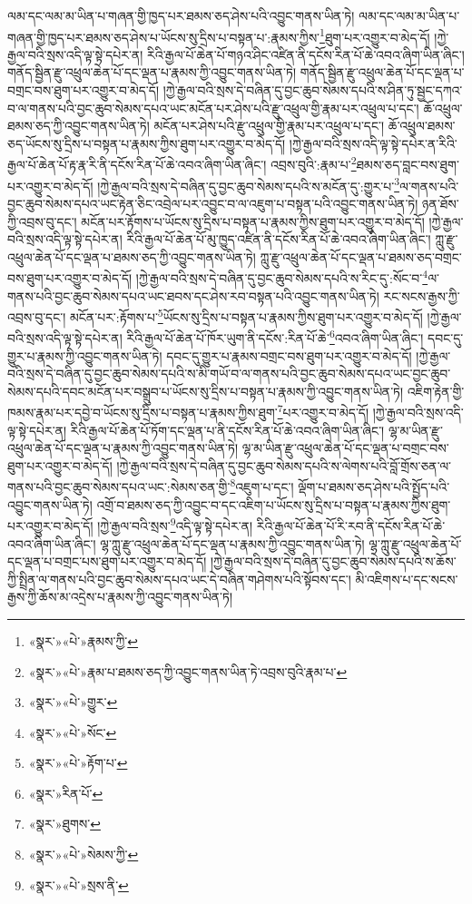 ལམ་དང་ལམ་མ་ཡིན་པ་གཞན་གྱི་ཁྱད་པར་ཐམས་ཅད་ཤེས་པའི་འབྱུང་གནས་ཡིན་ཏེ། ལམ་དང་ལམ་མ་ཡིན་པ་གཞན་གྱི་ཁྱད་པར་ཐམས་ཅད་ཤེས་པ་ཡོངས་སུ་དྲིས་པ་བསྟན་པ་:རྣམས་ཀྱིས་\footnote{«སྣར་»«པེ་»རྣམས་ཀྱི་}ཐུག་པར་འགྱུར་བ་མེད་དོ། །ཀྱེ་རྒྱལ་བའི་སྲས་འདི་ལྟ་སྟེ་དཔེར་ན། རིའི་རྒྱལ་པོ་ཆེན་པོ་གཉའ་ཤིང་འཛིན་ནི་དངོས་རིན་པོ་ཆེ་འབའ་ཞིག་ཡིན་ཞིང་། གནོད་སྦྱིན་རྫུ་འཕྲུལ་ཆེན་པོ་དང་ལྡན་པ་རྣམས་ཀྱི་འབྱུང་གནས་ཡིན་ཏེ། གནོད་སྦྱིན་རྫུ་འཕྲུལ་ཆེན་པོ་དང་ལྡན་པ་བགྲང་བས་ཐུག་པར་འགྱུར་བ་མེད་དོ། །ཀྱེ་རྒྱལ་བའི་སྲས་དེ་བཞིན་དུ་བྱང་ཆུབ་སེམས་དཔའི་ས་ཤིན་ཏུ་སྦྱང་དཀའ་བ་ལ་གནས་པའི་བྱང་ཆུབ་སེམས་དཔའ་ཡང་མངོན་པར་ཤེས་པའི་རྫུ་འཕྲུལ་གྱི་རྣམ་པར་འཕྲུལ་པ་དང་། ཆོ་འཕྲུལ་ཐམས་ཅད་ཀྱི་འབྱུང་གནས་ཡིན་ཏེ། མངོན་པར་ཤེས་པའི་རྫུ་འཕྲུལ་གྱི་རྣམ་པར་འཕྲུལ་པ་དང་། ཆོ་འཕྲུལ་ཐམས་ཅད་ཡོངས་སུ་དྲིས་པ་བསྟན་པ་རྣམས་ཀྱིས་ཐུག་པར་འགྱུར་བ་མེད་དོ། །ཀྱེ་རྒྱལ་བའི་སྲས་འདི་ལྟ་སྟེ་དཔེར་ན་རིའི་རྒྱལ་པོ་ཆེན་པོ་རྟ་རྣ་རི་ནི་དངོས་རིན་པོ་ཆེ་འབའ་ཞིག་ཡིན་ཞིང་། འབྲས་བུའི་:རྣམ་པ་\footnote{«སྣར་»«པེ་»རྣམ་པ་ཐམས་ཅད་ཀྱི་འབྱུང་གནས་ཡིན་ཏེ་འབྲས་བུའི་རྣམ་པ་}ཐམས་ཅད་བླང་བས་ཐུག་པར་འགྱུར་བ་མེད་དོ། །ཀྱེ་རྒྱལ་བའི་སྲས་དེ་བཞིན་དུ་བྱང་ཆུབ་སེམས་དཔའི་ས་མངོན་དུ་:གྱུར་པ་\footnote{«སྣར་»«པེ་»གྱུར་}ལ་གནས་པའི་བྱང་ཆུབ་སེམས་དཔའ་ཡང་རྟེན་ཅིང་འབྲེལ་པར་འབྱུང་བ་ལ་འཇུག་པ་བསྟན་པའི་འབྱུང་གནས་ཡིན་ཏེ། ཉན་ཐོས་ཀྱི་འབྲས་བུ་དང་། མངོན་པར་རྟོགས་པ་ཡོངས་སུ་དྲིས་པ་བསྟན་པ་རྣམས་ཀྱིས་ཐུག་པར་འགྱུར་བ་མེད་དོ། །ཀྱེ་རྒྱལ་བའི་སྲས་འདི་ལྟ་སྟེ་དཔེར་ན། རིའི་རྒྱལ་པོ་ཆེན་པོ་མུ་ཁྱུད་འཛིན་ནི་དངོས་རིན་པོ་ཆེ་འབའ་ཞིག་ཡིན་ཞིང་། ཀླུ་རྫུ་འཕྲུལ་ཆེན་པོ་དང་ལྡན་པ་ཐམས་ཅད་ཀྱི་འབྱུང་གནས་ཡིན་ཏེ། ཀླུ་རྫུ་འཕྲུལ་ཆེན་པོ་དང་ལྡན་པ་ཐམས་ཅད་བགྲང་བས་ཐུག་པར་འགྱུར་བ་མེད་དོ། །ཀྱེ་རྒྱལ་བའི་སྲས་དེ་བཞིན་དུ་བྱང་ཆུབ་སེམས་དཔའི་ས་རིང་དུ་:སོང་བ་\footnote{«སྣར་»«པེ་»སོང་}ལ་གནས་པའི་བྱང་ཆུབ་སེམས་དཔའ་ཡང་ཐབས་དང་ཤེས་རབ་བསྟན་པའི་འབྱུང་གནས་ཡིན་ཏེ། རང་སངས་རྒྱས་ཀྱི་འབྲས་བུ་དང་། མངོན་པར་:རྟོགས་པ་\footnote{«སྣར་»«པེ་»རྟོག་པ་}ཡོངས་སུ་དྲིས་པ་བསྟན་པ་རྣམས་ཀྱིས་ཐུག་པར་འགྱུར་བ་མེད་དོ། །ཀྱེ་རྒྱལ་བའི་སྲས་འདི་ལྟ་སྟེ་དཔེར་ན། རིའི་རྒྱལ་པོ་ཆེན་པོ་ཁོར་ཡུག་ནི་དངོས་:རིན་པོ་ཆེ་\footnote{«སྣར་»རིན་པོ་}འབའ་ཞིག་ཡིན་ཞིང་། དབང་དུ་གྱུར་པ་རྣམས་ཀྱི་འབྱུང་གནས་ཡིན་ཏེ། དབང་དུ་གྱུར་པ་རྣམས་བགྲང་བས་ཐུག་པར་འགྱུར་བ་མེད་དོ། །ཀྱེ་རྒྱལ་བའི་སྲས་དེ་བཞིན་དུ་བྱང་ཆུབ་སེམས་དཔའི་ས་མི་གཡོ་བ་ལ་གནས་པའི་བྱང་ཆུབ་སེམས་དཔའ་ཡང་བྱང་ཆུབ་སེམས་དཔའི་དབང་མངོན་པར་བསྒྲུབ་པ་ཡོངས་སུ་དྲིས་པ་བསྟན་པ་རྣམས་ཀྱི་འབྱུང་གནས་ཡིན་ཏེ། འཇིག་རྟེན་གྱི་ཁམས་རྣམ་པར་དབྱེ་བ་ཡོངས་སུ་དྲིས་པ་བསྟན་པ་རྣམས་ཀྱིས་ཐུག་\footnote{«སྣར་»ཐུགས་}པར་འགྱུར་བ་མེད་དོ། །ཀྱེ་རྒྱལ་བའི་སྲས་འདི་ལྟ་སྟེ་དཔེར་ན། རིའི་རྒྱལ་པོ་ཆེན་པོ་ཏོག་དང་ལྡན་པ་ནི་དངོས་རིན་པོ་ཆེ་འབའ་ཞིག་ཡིན་ཞིང་། ལྷ་མ་ཡིན་རྫུ་འཕྲུལ་ཆེན་པོ་དང་ལྡན་པ་རྣམས་ཀྱི་འབྱུང་གནས་ཡིན་ཏེ། ལྷ་མ་ཡིན་རྫུ་འཕྲུལ་ཆེན་པོ་དང་ལྡན་པ་བགྲང་བས་ཐུག་པར་འགྱུར་བ་མེད་དོ། །ཀྱེ་རྒྱལ་བའི་སྲས་དེ་བཞིན་དུ་བྱང་ཆུབ་སེམས་དཔའི་ས་ལེགས་པའི་བློ་གྲོས་ཅན་ལ་གནས་པའི་བྱང་ཆུབ་སེམས་དཔའ་ཡང་:སེམས་ཅན་གྱི་\footnote{«སྣར་»«པེ་»སེམས་ཀྱི་}འཇུག་པ་དང་། ལྡོག་པ་ཐམས་ཅད་ཤེས་པའི་སྤྱོད་པའི་འབྱུང་གནས་ཡིན་ཏེ། འགྲོ་བ་ཐམས་ཅད་ཀྱི་འབྱུང་བ་དང་འཇིག་པ་ཡོངས་སུ་དྲིས་པ་བསྟན་པ་རྣམས་ཀྱིས་ཐུག་པར་འགྱུར་བ་མེད་དོ། །ཀྱེ་རྒྱལ་བའི་སྲས་\footnote{«སྣར་»«པེ་»སྲས་ནི་}འདི་ལྟ་སྟེ་དཔེར་ན། རིའི་རྒྱལ་པོ་ཆེན་པོ་རི་རབ་ནི་དངོས་རིན་པོ་ཆེ་འབའ་ཞིག་ཡིན་ཞིང་། ལྷ་ཀླུ་རྫུ་འཕྲུལ་ཆེན་པོ་དང་ལྡན་པ་རྣམས་ཀྱི་འབྱུང་གནས་ཡིན་ཏེ། ལྷ་ཀླུ་རྫུ་འཕྲུལ་ཆེན་པོ་དང་ལྡན་པ་བགྲང་པས་ཐུག་པར་འགྱུར་བ་མེད་དོ། །ཀྱེ་རྒྱལ་བའི་སྲས་དེ་བཞིན་དུ་བྱང་ཆུབ་སེམས་དཔའི་ས་ཆོས་ཀྱི་སྤྲིན་ལ་གནས་པའི་བྱང་ཆུབ་སེམས་དཔའ་ཡང་དེ་བཞིན་གཤེགས་པའི་སྟོབས་དང་། མི་འཇིགས་པ་དང་སངས་རྒྱས་ཀྱི་ཆོས་མ་འདྲེས་པ་རྣམས་ཀྱི་འབྱུང་གནས་ཡིན་ཏེ། 